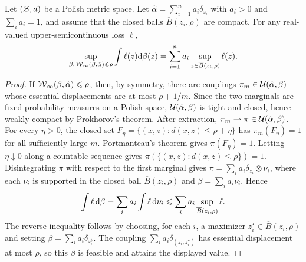 \begin{prop}\label{prop-wasserstein-infty-dro}
	Let $(\mathcal{Z},d)$ be a Polish metric space. Let $\hat\alpha=\sum_{i=1}^n a_i\delta_{z_i}$ with $a_i>0$ and $\sum_i a_i=1$, and assume that the closed balls $\overline B(z_i,\rho)$ are compact. For any real-valued upper-semicontinuous loss $\ell$,
	\[
		\sup_{\beta:\,\operatorname{\mathcal{W}}_\infty(\beta,\hat\alpha)\leqslant\rho}
		\int \ell(z)\mathrm{d}\beta(z)
		=
		\sum_{i=1}^n a_i\sup_{z\in\overline B(z_i,\rho)}\ell(z).
	\]
\end{prop}
\begin{proof}
	If $\operatorname{\mathcal{W}}_\infty(\beta,\hat\alpha)\leqslant\rho$, then, by symmetry, there are couplings $\pi_m\in\mathcal{U}(\hat\alpha,\beta)$ whose essential displacements are at most $\rho+1/m$. Since the two marginals are fixed probability measures on a Polish space, $\mathcal{U}(\hat\alpha,\beta)$ is tight and closed, hence weakly compact by Prokhorov's theorem. After extraction, $\pi_m\rightharpoonup\pi\in\mathcal{U}(\hat\alpha,\beta)$.
	For every $\eta>0$, the closed set $F_\eta=\{(x,z):d(x,z)\leq\rho+\eta\}$ has $\pi_m(F_\eta)=1$ for all sufficiently large $m$. Portmanteau's theorem gives $\pi(F_\eta)=1$. Letting $\eta\downarrow0$ along a countable sequence gives $\pi(\{(x,z):d(x,z)\leq\rho\})=1$.
	Disintegrating $\pi$ with respect to the first marginal gives $\pi=\sum_i a_i\delta_{z_i}\otimes\nu_i$, where each $\nu_i$ is supported in the closed ball $\overline B(z_i,\rho)$ and $\beta=\sum_i a_i\nu_i$. Hence
	\[
		\int\ell\,\mathrm{d}\beta
		=
		\sum_i a_i\int\ell\,\mathrm{d}\nu_i
		\leqslant
		\sum_i a_i\sup_{\overline B(z_i,\rho)}\ell.
	\]
	The reverse inequality follows by choosing, for each $i$, a maximizer $z_i^\star\in\overline B(z_i,\rho)$ and setting $\beta=\sum_i a_i\delta_{z_i^\star}$. The coupling $\sum_i a_i\delta_{(z_i,z_i^\star)}$ has essential displacement at most $\rho$, so this $\beta$ is feasible and attains the displayed value.
\end{proof}
